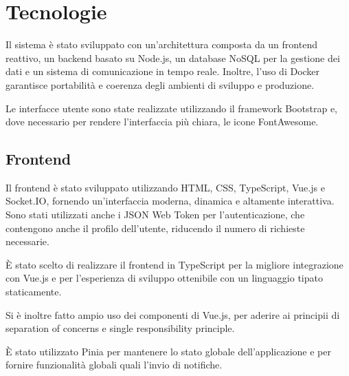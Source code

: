 \documentclass{report}
\begin{document}
\section{Tecnologie}
\par Il sistema è stato sviluppato con un'architettura composta da un frontend reattivo, un backend basato su Node.js, un database NoSQL per la gestione dei dati e un sistema di comunicazione in tempo reale. Inoltre, l'uso di Docker garantisce portabilità e coerenza degli ambienti di sviluppo e produzione.
\par Le interfacce utente sono state realizzate utilizzando il framework Bootstrap e, dove necessario per rendere l'interfaccia più chiara, le icone FontAwesome.
\subsection{Frontend}
\par Il frontend è stato sviluppato utilizzando HTML, CSS, TypeScript, Vue.js e Socket.IO, fornendo un'interfaccia moderna, dinamica e altamente interattiva. Sono stati utilizzati anche i JSON Web Token \citep{rfc7519} per l'autenticazione, che contengono anche il profilo dell'utente, riducendo il numero di richieste necessarie.
\par È stato scelto di realizzare il frontend in TypeScript per la migliore integrazione con Vue.js e per l'esperienza di sviluppo ottenibile con un linguaggio tipato staticamente.
\par Si è inoltre fatto ampio uso dei componenti di Vue.js, per aderire ai principii di separation of concerns e single responsibility principle.
\par È stato utilizzato Pinia per mantenere lo stato globale dell'applicazione e per fornire funzionalità globali quali l'invio di notifiche.
\end{document}
